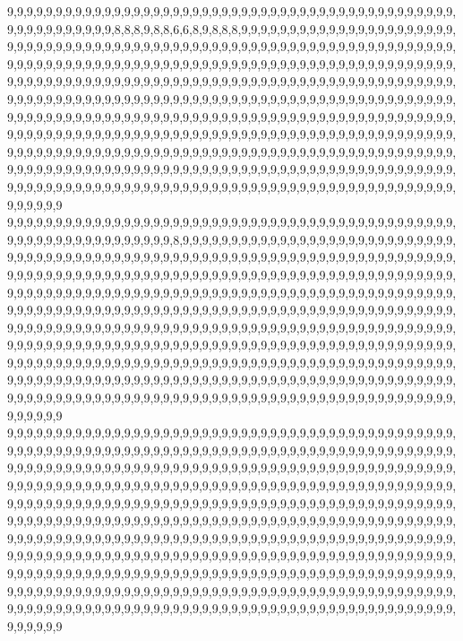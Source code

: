 9,9,9,9,9,9,9,9,9,9,9,9,9,9,9,9,9,9,9,9,9,9,9,9,9,9,9,9,9,9,9,9,9,9,9,9,9,9,9,9,9,9,9,9,9,9,9,9,9,9,9,9,9,9,9,9,9,8,8,8,9,8,8,6,6,8,9,8,8,8,9,9,9,9,9,9,9,9,9,9,9,9,9,9,9,9,9,9,9,9,9,9,9,9,9,9,9,9,9,9,9,9,9,9,9,9,9,9,9,9,9,9,9,9,9,9,9,9,9,9,9,9,9,9,9,9,9,9,9,9,9,9,9,9,9,9,9,9,9,9,9,9,9,9,9,9,9,9,9,9,9,9,9,9,9,9,9,9,9,9,9,9,9,9,9,9,9,9,9,9,9,9,9,9,9,9,9,9,9,9,9,9,9,9,9,9,9,9,9,9,9,9,9,9,9,9,9,9,9,9,9,9,9,9,9,9,9,9,9,9,9,9,9,9,9,9,9,9,9,9,9,9,9,9,9,9,9,9,9,9,9,9,9,9,9,9,9,9,9,9,9,9,9,9,9,9,9,9,9,9,9,9,9,9,9,9,9,9,9,9,9,9,9,9,9,9,9,9,9,9,9,9,9,9,9,9,9,9,9,9,9,9,9,9,9,9,9,9,9,9,9,9,9,9,9,9,9,9,9,9,9,9,9,9,9,9,9,9,9,9,9,9,9,9,9,9,9,9,9,9,9,9,9,9,9,9,9,9,9,9,9,9,9,9,9,9,9,9,9,9,9,9,9,9,9,9,9,9,9,9,9,9,9,9,9,9,9,9,9,9,9,9,9,9,9,9,9,9,9,9,9,9,9,9,9,9,9,9,9,9,9,9,9,9,9,9,9,9,9,9,9,9,9,9,9,9,9,9,9,9,9,9,9,9,9,9,9,9,9,9,9,9,9,9,9,9,9,9,9,9,9,9,9,9,9,9,9,9,9,9,9,9,9,9,9,9,9,9,9,9,9,9,9,9,9,9,9,9,9,9,9,9,9,9,9,9,9,9,9,9,9,9,9,9,9,9,9,9,9,9,9,9,9,9,9,9,9,9,9,9,9,9,9,9,9,9,9,9,9,9,9,9,9,9,9,9,9,9,9,9,9,9,9,9,9,9,9,9,9,9,9,9
9,9,9,9,9,9,9,9,9,9,9,9,9,9,9,9,9,9,9,9,9,9,9,9,9,9,9,9,9,9,9,9,9,9,9,9,9,9,9,9,9,9,9,9,9,9,9,9,9,9,9,9,9,9,9,9,9,9,9,9,9,9,9,8,9,9,9,9,9,9,9,9,9,9,9,9,9,9,9,9,9,9,9,9,9,9,9,9,9,9,9,9,9,9,9,9,9,9,9,9,9,9,9,9,9,9,9,9,9,9,9,9,9,9,9,9,9,9,9,9,9,9,9,9,9,9,9,9,9,9,9,9,9,9,9,9,9,9,9,9,9,9,9,9,9,9,9,9,9,9,9,9,9,9,9,9,9,9,9,9,9,9,9,9,9,9,9,9,9,9,9,9,9,9,9,9,9,9,9,9,9,9,9,9,9,9,9,9,9,9,9,9,9,9,9,9,9,9,9,9,9,9,9,9,9,9,9,9,9,9,9,9,9,9,9,9,9,9,9,9,9,9,9,9,9,9,9,9,9,9,9,9,9,9,9,9,9,9,9,9,9,9,9,9,9,9,9,9,9,9,9,9,9,9,9,9,9,9,9,9,9,9,9,9,9,9,9,9,9,9,9,9,9,9,9,9,9,9,9,9,9,9,9,9,9,9,9,9,9,9,9,9,9,9,9,9,9,9,9,9,9,9,9,9,9,9,9,9,9,9,9,9,9,9,9,9,9,9,9,9,9,9,9,9,9,9,9,9,9,9,9,9,9,9,9,9,9,9,9,9,9,9,9,9,9,9,9,9,9,9,9,9,9,9,9,9,9,9,9,9,9,9,9,9,9,9,9,9,9,9,9,9,9,9,9,9,9,9,9,9,9,9,9,9,9,9,9,9,9,9,9,9,9,9,9,9,9,9,9,9,9,9,9,9,9,9,9,9,9,9,9,9,9,9,9,9,9,9,9,9,9,9,9,9,9,9,9,9,9,9,9,9,9,9,9,9,9,9,9,9,9,9,9,9,9,9,9,9,9,9,9,9,9,9,9,9,9,9,9,9,9,9,9,9,9,9,9,9,9,9,9,9,9,9,9,9,9,9,9,9,9,9,9,9,9,9,9,9,9,9,9,9,9,9,9,9,9,9,9,9,9,9,9,9,9,9,9,9,9,9,9,9
9,9,9,9,9,9,9,9,9,9,9,9,9,9,9,9,9,9,9,9,9,9,9,9,9,9,9,9,9,9,9,9,9,9,9,9,9,9,9,9,9,9,9,9,9,9,9,9,9,9,9,9,9,9,9,9,9,9,9,9,9,9,9,9,9,9,9,9,9,9,9,9,9,9,9,9,9,9,9,9,9,9,9,9,9,9,9,9,9,9,9,9,9,9,9,9,9,9,9,9,9,9,9,9,9,9,9,9,9,9,9,9,9,9,9,9,9,9,9,9,9,9,9,9,9,9,9,9,9,9,9,9,9,9,9,9,9,9,9,9,9,9,9,9,9,9,9,9,9,9,9,9,9,9,9,9,9,9,9,9,9,9,9,9,9,9,9,9,9,9,9,9,9,9,9,9,9,9,9,9,9,9,9,9,9,9,9,9,9,9,9,9,9,9,9,9,9,9,9,9,9,9,9,9,9,9,9,9,9,9,9,9,9,9,9,9,9,9,9,9,9,9,9,9,9,9,9,9,9,9,9,9,9,9,9,9,9,9,9,9,9,9,9,9,9,9,9,9,9,9,9,9,9,9,9,9,9,9,9,9,9,9,9,9,9,9,9,9,9,9,9,9,9,9,9,9,9,9,9,9,9,9,9,9,9,9,9,9,9,9,9,9,9,9,9,9,9,9,9,9,9,9,9,9,9,9,9,9,9,9,9,9,9,9,9,9,9,9,9,9,9,9,9,9,9,9,9,9,9,9,9,9,9,9,9,9,9,9,9,9,9,9,9,9,9,9,9,9,9,9,9,9,9,9,9,9,9,9,9,9,9,9,9,9,9,9,9,9,9,9,9,9,9,9,9,9,9,9,9,9,9,9,9,9,9,9,9,9,9,9,9,9,9,9,9,9,9,9,9,9,9,9,9,9,9,9,9,9,9,9,9,9,9,9,9,9,9,9,9,9,9,9,9,9,9,9,9,9,9,9,9,9,9,9,9,9,9,9,9,9,9,9,9,9,9,9,9,9,9,9,9,9,9,9,9,9,9,9,9,9,9,9,9,9,9,9,9,9,9,9,9,9,9,9,9,9,9,9,9,9,9,9,9,9,9,9,9,9,9,9,9,9,9,9,9,9,9,9,9,9,9,9,9,9,9,9,9,9,9,9,9,9
